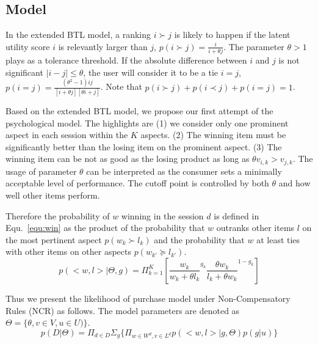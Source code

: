 \documentclass[11pt]{report}
\begin{document}
\subsection{Model}
In the extended BTL model, a ranking $i \succ j$ is likely to happen if the latent utility score $i$ is relevantly larger than $j$, $p(i \succ j)=\frac{i}{i+ \theta j}$.  The parameter $\theta>1$ plays as a tolerance threshold. If the absolute difference between $i$ and $j$ is not significant $|i-j|\leq \theta$, the user will consider it to be a tie $i=j$, $p(i = j)=\frac{(\theta^2-1)i j}{[i+\theta j][\theta i+ j]}$. Note that $p(i \succ j)+ p(i \prec j) + p(i=j) =1$. 
 
Based on the extended BTL model, we propose our first attempt of the psychological model. The highlights are (1) we consider only one prominent aspect in each session within the $K$ aspects. (2) The winning item must be significantly better than the losing item on the prominent aspect. (3) The winning item can be not as good as the losing product as long as $\theta v_{i,k} >  v_{j,k}$. The usage of parameter $\theta$ can be interpreted as the consumer sets a minimally acceptable level of performance. The cutoff point is controlled by both $\theta$ and how well other items perform.

Therefore the probability of  $w$ winning in the session $d$ is defined in Equ.~\ref{equ:win} as the product of the probability that $w$ outranks other items $l$ on the most pertinent aspect $p(w_k\succ l_k)$ and the probability that $w$ at least ties with other items on other aspects $p(w_{k'} \succeq l_{k'})$.
\begin{equation}\label{equ:win}
p(<w,l>|\Theta,g)  =  \Pi_{k=1}^{K}[ {\frac{w_k}{w_k+\theta l_k}}^{g_k} { \frac{\theta w_{k}}{l_{k}+\theta w_{k}}}^{1-g_k}]
\end{equation}

Thus we present the likelihood of purchase model under Non-Compensatory Rules (NCR) as follows. The model parameters are denoted as $\Theta=\{\theta,v\in V, u\in U)\}$.     
\begin{equation}\label{equ:likelihood}
		p(D|\Theta)=\Pi_{d\in D} \Sigma_{g} \{\Pi_{w\in W^d, v\in L^d} p(<w,l>|g,\Theta) p(g|u)\}
\end{equation}
\end{document}
